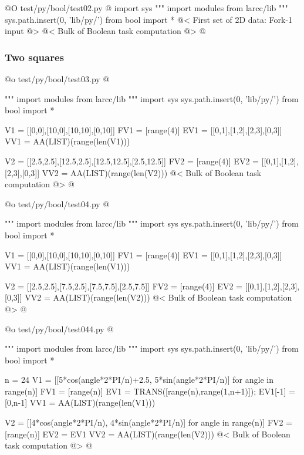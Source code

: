 \documentclass[11pt,oneside]{article}	%
\begin{document}
@O test/py/bool/test02.py
@{
import sys
""" import modules from larcc/lib """
sys.path.insert(0, 'lib/py/')
from bool import *
@< First set of 2D data: Fork-1 input @>
@< Bulk of Boolean task computation @>
@}


\subsubsection{Two squares}




@o test/py/bool/test03.py
@{""" import modules from larcc/lib """
import sys
sys.path.insert(0, 'lib/py/')
from bool import *

V1 = [[0,0],[10,0],[10,10],[0,10]]
FV1 = [range(4)]
EV1 = [[0,1],[1,2],[2,3],[0,3]]
VV1 = AA(LIST)(range(len(V1)))

V2 = [[2.5,2.5],[12.5,2.5],[12.5,12.5],[2.5,12.5]]
FV2 = [range(4)]
EV2 = [[0,1],[1,2],[2,3],[0,3]]
VV2 = AA(LIST)(range(len(V2)))
@< Bulk of Boolean task computation @>
@}


@o test/py/bool/test04.py
@{""" import modules from larcc/lib """
import sys
sys.path.insert(0, 'lib/py/')
from bool import *

V1 = [[0,0],[10,0],[10,10],[0,10]]
FV1 = [range(4)]
EV1 = [[0,1],[1,2],[2,3],[0,3]]
VV1 = AA(LIST)(range(len(V1)))

V2 = [[2.5,2.5],[7.5,2.5],[7.5,7.5],[2.5,7.5]]
FV2 = [range(4)]
EV2 = [[0,1],[1,2],[2,3],[0,3]]
VV2 = AA(LIST)(range(len(V2)))
@< Bulk of Boolean task computation @>
@}

@o test/py/bool/test044.py
@{""" import modules from larcc/lib """
import sys
sys.path.insert(0, 'lib/py/')
from bool import *

n = 24
V1 = [[5*cos(angle*2*PI/n)+2.5, 5*sin(angle*2*PI/n)] for angle in range(n)]
FV1 = [range(n)]
EV1 = TRANS([range(n),range(1,n+1)]); EV1[-1] = [0,n-1]
VV1 = AA(LIST)(range(len(V1)))

V2 = [[4*cos(angle*2*PI/n), 4*sin(angle*2*PI/n)] for angle in range(n)]
FV2 = [range(n)]
EV2 = EV1
VV2 = AA(LIST)(range(len(V2)))
@< Bulk of Boolean task computation @>
@}
\end{document}
